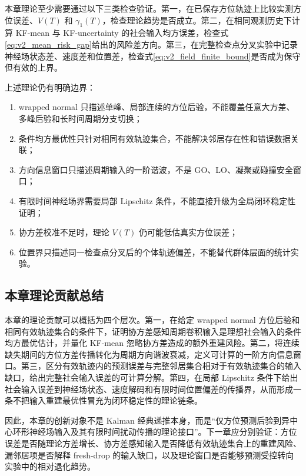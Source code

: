 \documentclass[UTF8,fontset=windows,11pt]{ctexart}
\theoremstyle{cnplain}
\numberwithin{equation}{section}
\begin{document}
本章理论至少需要通过以下三类检查验证。第一，在已保存方位轨迹上比较实测方位误差、$V(T)$ 和 $\gamma_1(T)$，检查理论趋势是否成立。第二，在相同观测历史下计算 KF-mean 与 KF-uncertainty 的社会输入均方误差，检查式\eqref{eq:v2_mean_risk_gap}给出的风险差方向。第三，在完整检查点分叉实验中记录神经场状态差、速度差和位置差，检查式\eqref{eq:v2_field_finite_bound}是否成为保守但有效的上界。

上述理论仍有明确边界：
\begin{enumerate}
 \item wrapped normal 只描述单峰、局部连续的方位后验，不能覆盖任意大方差、多峰后验和长时间周期分支切换；
 \item 条件均方最优性只针对相同有效轨迹集合，不能解决邻居存在性和错误数据关联；
 \item 方向信息窗口只描述周期输入的一阶谐波，不是 GO、LO、凝聚或碰撞安全窗口；
 \item 有限时间神经场界需要局部 Lipschitz 条件，不能直接升级为全局闭环稳定性证明；
 \item 协方差校准不足时，理论 $V(T)$ 仍可能低估真实方位误差；
 \item 位置界只描述同一检查点分叉后的个体轨迹偏差，不能替代群体层面的统计实验。
\end{enumerate}

\subsection{本章理论贡献总结}

本章的理论贡献可以概括为四个层次。第一，在给定 wrapped normal 方位后验和相同有效轨迹集合的条件下，证明协方差感知周期卷积输入是理想社会输入的条件均方最优估计，并量化 KF-mean 忽略协方差造成的额外重建风险。第二，将连续缺失期间的方位方差传播转化为周期方向谐波衰减，定义可计算的一阶方向信息窗口。第三，区分有效轨迹内的预测误差与完整邻居集合相对于有效轨迹集合的输入缺口，给出完整社会输入误差的可计算分解。第四，在局部 Lipschitz 条件下给出社会输入误差到神经场状态、速度解码和有限时间位置偏差的传播界，从而形成一条不把输入重建最优性冒充为闭环稳定性的理论链条。

因此，本章的创新对象不是 Kalman 经典递推本身，而是“仅方位预测后验到异中心环形神经场输入及其有限时间扰动传播的理论接口”。下一章应分别验证：方位误差是否随理论方差增长、协方差感知输入是否降低有效轨迹集合上的重建风险、漏邻居项是否解释 fresh-drop 的输入缺口，以及理论窗口是否能够预测受控转向实验中的相对退化趋势。
\end{document}
